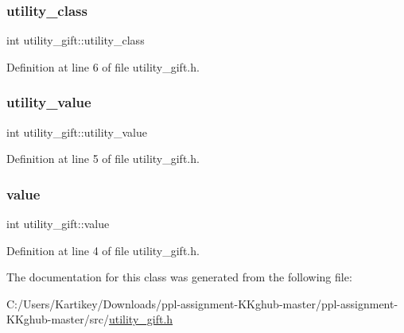 \subsubsection{\texorpdfstring{utility\+\_\+class}{utility\_class}}
{\footnotesize\ttfamily int utility\+\_\+gift\+::utility\+\_\+class}



Definition at line 6 of file utility\+\_\+gift.\+h.

\mbox{\label{classutility__gift_a344f2664f906b148f7d59ca0c3f37f80}} 
\subsubsection{\texorpdfstring{utility\+\_\+value}{utility\_value}}
{\footnotesize\ttfamily int utility\+\_\+gift\+::utility\+\_\+value}



Definition at line 5 of file utility\+\_\+gift.\+h.

\mbox{\label{classutility__gift_adcb888522cd06ce71f7f88c13fc35daf}} 
\subsubsection{\texorpdfstring{value}{value}}
{\footnotesize\ttfamily int utility\+\_\+gift\+::value}



Definition at line 4 of file utility\+\_\+gift.\+h.



The documentation for this class was generated from the following file\+:\begin{DoxyCompactItemize}
\item 
C\+:/\+Users/\+Kartikey/\+Downloads/ppl-\/assignment-\/\+K\+Kghub-\/master/ppl-\/assignment-\/\+K\+Kghub-\/master/src/\hyperlink{utility__gift_8h}{utility\+\_\+gift.\+h}\end{DoxyCompactItemize}

